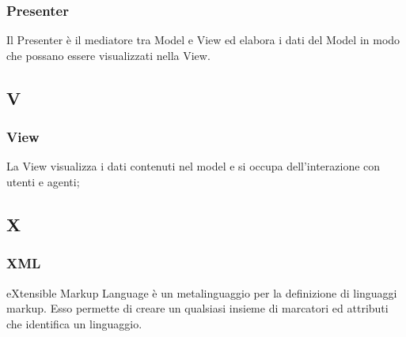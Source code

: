 \subsubsection*{Presenter}
Il Presenter è il mediatore tra Model e View ed elabora i dati del Model in modo che possano essere visualizzati nella View.

\subsection*{V}
\subsubsection*{View}
La View visualizza i dati contenuti nel model e si occupa dell'interazione con utenti e agenti;

\subsection*{X}
\subsubsection*{XML}
eXtensible Markup Language è un metalinguaggio per la definizione di linguaggi markup. Esso permette di creare un qualsiasi insieme di marcatori ed attributi che identifica un linguaggio.
